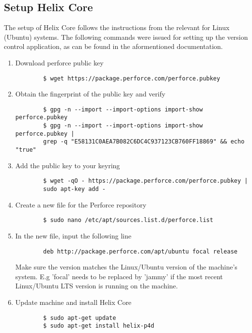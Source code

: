 \subsection{Setup Helix Core}
The setup of Helix Core follows the instructions from the 
\href{https://help.perforce.com/helix-core/quickstart/Content/quickstart/admin-install-linux.html}{\color{blue}{Helix Core Server Administrator Guide}}
relevant for Linux (Ubuntu) systems. The following commands were issued for setting up the version control application, as 
can be found in the aformentioned documentation.
\begin{enumerate}
    \item Download perforce public key
    \begin{verbatim}
        $ wget https://package.perforce.com/perforce.pubkey
    \end{verbatim}
    \item Obtain the fingerprint of the public key and verify
    \begin{verbatim}
        $ gpg -n --import --import-options import-show perforce.pubkey
        $ gpg -n --import --import-options import-show perforce.pubkey | 
        grep -q "E58131C0AEA7B082C6DC4C937123CB760FF18869" && echo "true"
    \end{verbatim}
    \item Add the public key to your keyring
    \begin{verbatim}
        $ wget -qO - https://package.perforce.com/perforce.pubkey | 
        sudo apt-key add -
    \end{verbatim}
    \item Create a new file for the Perforce repository
    \begin{verbatim}
        $ sudo nano /etc/apt/sources.list.d/perforce.list
    \end{verbatim}
    \item In the new file, input the following line
    \begin{verbatim}
        deb http://package.perforce.com/apt/ubuntu focal release
    \end{verbatim}
    Make sure the version matches the Linux/Ubuntu version of the machine's system. E.g 'focal' needs to be replaced by
    'jammy' if the most recent Linux/Ubuntu LTS version is running on the machine.
    \item Update machine and install Helix Core
    \begin{verbatim}
        $ sudo apt-get update
        $ sudo apt-get install helix-p4d

\end{verbatim}
\end{enumerate}
